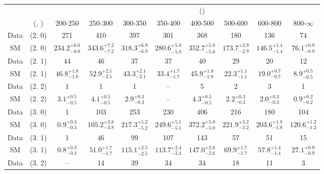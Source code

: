 \begin{table}[h!]
\tiny
\centering
{}
\begin{tabular}
{cccccccccc}
	\hline\hline
&	&	& \multicolumn{8}{c}{\scalht (\gev)}\\ 
	&	 (\njet, \nb) & 200-250 & 250-300 & 300-350 & 350-400 & 400-500 & 500-600 & 600-800 & 800-$\infty$ \\ [0.8ex] 
\hline
	Data & (2. 0) & 271 & 410 & 397 & 301 & 368 & 180 & 136 & 74 \\[0.5ex] 
	SM & (2. 0) & $234.2^{+ 6.0 }_{- 6.0 }$ & $343.6^{+ 7.2 }_{- 7.2 }$ & $318.3^{+ 6.9 }_{- 6.9 }$ & $280.6^{+ 5.8 }_{- 5.8 }$ & $352.7^{+ 5.0 }_{- 5.0 }$ & $173.7^{+ 2.9 }_{- 2.9 }$ & $146.5^{+ 1.4 }_{- 1.4 }$ & $76.1^{+ 0.9 }_{- 0.9 }$ \\[0.5ex] 
	Data & (2. 1) & 44 & 46 & 37 & 37 & 40 & 29 & 20 & 12 \\[0.5ex] 
	SM & (2. 1) & $46.8^{+ 1.8 }_{- 1.8 }$ & $52.9^{+ 2.1 }_{- 2.1 }$ & $43.3^{+ 2.1 }_{- 2.1 }$ & $33.4^{+ 1.7 }_{- 1.7 }$ & $45.9^{+ 1.8 }_{- 1.8 }$ & $22.3^{+ 1.1 }_{- 1.1 }$ & $19.0^{+ 0.7 }_{- 0.7 }$ & $8.9^{+ 0.5 }_{- 0.5 }$ \\[0.5ex] 
	Data & (2. 2) & 1 & 1 & 1 & -- & 5 & 2 & 3 & 1 \\[0.5ex] 
	SM & (2. 2) & $3.1^{+ 0.5 }_{- 0.5 }$ & $4.1^{+ 0.5 }_{- 0.5 }$ & $2.9^{+ 0.3 }_{- 0.3 }$ & -- & $4.3^{+ 0.5 }_{- 0.5 }$ & $2.2^{+ 0.3 }_{- 0.3 }$ & $2.0^{+ 0.3 }_{- 0.3 }$ & $0.9^{+ 0.2 }_{- 0.2 }$ \\[0.5ex] 
	Data & (3. 0) & 1 & 103 & 253 & 230 & 406 & 216 & 180 & 104 \\[0.5ex] 
	SM & (3. 0) & $0.9^{+ 0.3 }_{- 0.3 }$ & $105.2^{+ 3.8 }_{- 3.8 }$ & $217.3^{+ 5.2 }_{- 5.2 }$ & $249.6^{+ 5.1 }_{- 5.1 }$ & $372.2^{+ 5.0 }_{- 5.0 }$ & $221.9^{+ 3.2 }_{- 3.2 }$ & $203.6^{+ 1.8 }_{- 1.8 }$ & $120.6^{+ 1.2 }_{- 1.2 }$ \\[0.5ex] 
	Data & (3. 1) & 1 & 46 & 99 & 107 & 143 & 57 & 51 & 15 \\[0.5ex] 
	SM & (3. 1) & $0.8^{+ 0.3 }_{- 0.3 }$ & $51.0^{+ 1.7 }_{- 1.7 }$ & $115.1^{+ 2.5 }_{- 2.5 }$ & $113.7^{+ 2.4 }_{- 2.4 }$ & $147.0^{+ 2.6 }_{- 2.6 }$ & $69.9^{+ 1.7 }_{- 1.7 }$ & $57.8^{+ 1.4 }_{- 1.4 }$ & $27.1^{+ 0.9 }_{- 0.9 }$ \\[0.5ex] 
	Data & (3. 2) & -- & 14 & 39 & 34 & 34 & 18 & 11 & 3 \\[0.5ex] 

\end{tabular}
\end{table}
